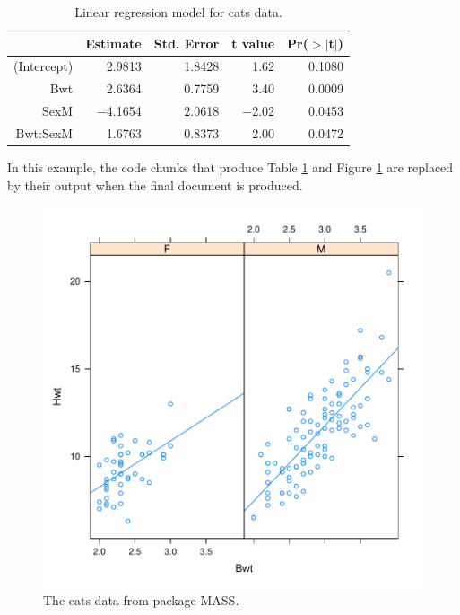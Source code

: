 \documentclass[11pt,article,oneside]{memoir}
\begin{document}

\begin{table}[ht]
\footnotesize
\begin{center}
\begin{tabular}{rrrrr}
\hline
 & Estimate & Std. Error & t value & Pr($>$$|$t$|$) \\
\hline
(Intercept) & 2.9813 & 1.8428 & 1.62 & 0.1080 \\
Bwt & 2.6364 & 0.7759 & 3.40 & 0.0009 \\
SexM & $-$4.1654 & 2.0618 & $-$2.02 & 0.0453 \\
Bwt:SexM & 1.6763 & 0.8373 & 2.00 & 0.0472 \\
\hline
\end{tabular}
\caption{\small Linear regression model for cats data.}
\label{tab:coef}
\end{center}
\end{table}
\normalsize 

In this example, the code chunks that produce Table \ref{tab:coef} and Figure
\ref{fig:cats} are replaced by their output when the final document is produced. 

\begin{figure}[h!]
  \centering
{} 
\includegraphics{figures/apps-figure}

  \caption{\small The cats data from package MASS.}
  \label{fig:cats}
\end{figure}
\label{sec:append-sweave-exampl}
\end{document}

